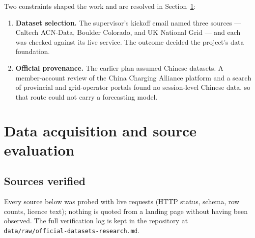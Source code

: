 \documentclass[11pt,a4paper]{article}
\newcommand{\code}[1]{\texttt{\small #1}}
\begin{document}
Two constraints shaped the work and are resolved in Section~\ref{sec:data}:

\begin{enumerate}
  \item \textbf{Dataset selection.} The supervisor's kickoff email named three sources — Caltech
        ACN-Data, Boulder Colorado, and UK National Grid — and each was checked against its live
        service. The outcome decided the project's data foundation.
  \item \textbf{Official provenance.} The earlier plan assumed Chinese datasets. A member-account
        review of the China Charging Alliance platform and a search of provincial and
        grid-operator portals found no session-level Chinese data, so that route could not carry a
        forecasting model.
\end{enumerate}

\section{Data acquisition and source evaluation}\label{sec:data}

\subsection{Sources verified}

Every source below was probed with live requests (HTTP status, schema, row counts, licence
text); nothing is quoted from a landing page without having been observed. The full
verification log is kept in the repository at \code{data/raw/official-datasets-research.md}.
\end{document}
